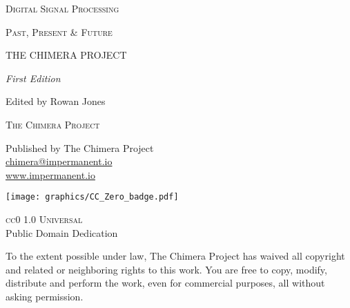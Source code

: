 \newpage
\thispagestyle{empty}
\vspace*{4cm}
\begin{center}

{\fontsize{11}{13}\selectfont\textsc{Digital Signal Processing}}

\vspace{0.3cm}

{\fontsize{11}{13}\selectfont\textsc{Past, Present \& Future}}

\vspace{2.5cm}

{\trajantitle\fontsize{36}{42}\selectfont THE CHIMERA PROJECT}

\vspace{2cm}

{\Large\textit{First Edition}}

\vspace{0.5cm}

{\large Edited by Rowan Jones}

\vspace*{\fill}

\end{center}
\newpage

\newpage
\thispagestyle{empty}
\vspace*{\fill}
\begin{center}

{\large\textsc{The Chimera Project}}

\vspace{1.5cm}

Published by The Chimera Project\\
\href{mailto:chimera@impermanent.io}{chimera@impermanent.io}\\
\url{www.impermanent.io}

\vspace{2cm}

\texttt{[image: graphics/CC\_Zero\_badge.pdf]}

\vspace{0.8cm}

{\large\textsc{cc0 1.0 Universal}}\\
\vspace{0.3cm}
{\normalsize Public Domain Dedication}

\vspace{1.5cm}

\begin{minipage}{0.75\textwidth}
\centering
{\small To the extent possible under law, The Chimera Project has waived all copyright and related or neighboring rights to this work. You are free to copy, modify, distribute and perform the work, even for commercial purposes, all without asking permission.}
\end{minipage}

\end{center}
\vspace*{\fill}
\newpage